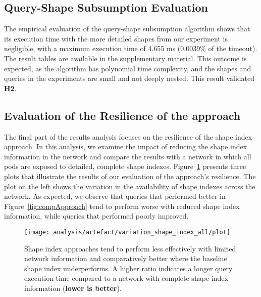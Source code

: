 \subsection{Query-Shape Subsumption Evaluation} \label{sec:experimentAlgoSubsumption}

The empirical evaluation of the query-shape subsumption algorithm shows that its execution time with the more detailed shapes from our experiment is negligible, with a maximum execution time of 4.655 ms (0.0039\% of the timeout).
The result tables are available in the \hyperref[sec:supplementalMaterial]{supplementary material}.
This outcome is expected, as the algorithm has polynomial time complexity, and the shapes and queries in the experiments are small and not deeply nested.
This result validated \textbf{H2}.


\subsection{Evaluation of the Resilience of the approach}

The final part of the results analysis focuses on the resilience of the shape index approach.
In this analysis, we examine the impact of reducing the shape index information in the network and compare the results with a network in which all pods are exposed to detailed, complete shape indexes.
Figure~\ref{fig:adaptShapeIndex} presents three plots that illustrate the results of our evaluation of the approach's resilience.
The plot on the left shows the variation in the availability of shape indexes across the network. 
As expected, we observe that queries that performed better in Figure~\ref{fig:compApproach} tend to perform worse with reduced shape index information, while queries that performed poorly improved. 


\begin{figure}
    \centering
    \texttt{[image: analysis/artefact/variation\_shape\_index\_all/plot]}
    \caption{
    Shape index approaches tend to perform less effectively with limited network information and comparatively better where the baseline shape index underperforms.
    A higher ratio indicates a longer query execution time compared to a network with complete shape index information (\textbf{lower is better}).
    }
    \label{fig:adaptShapeIndex}
\end{figure}


